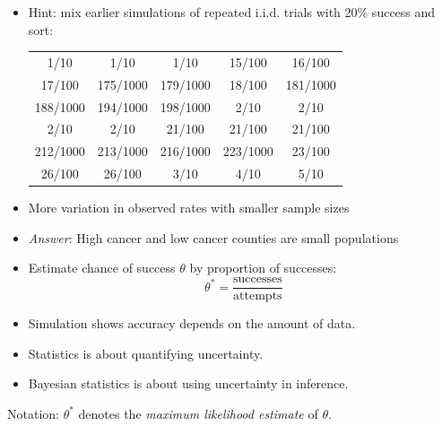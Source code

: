 \documentclass[10pt]{report}
\begin{document}
%
\begin{itemize}
\item Hint: mix earlier simulations of repeated i.i.d. trials with 20\% success and sort:
{\footnotesize
\begin{center}
\begin{tabular}{ccccc}
1/10 &  1/10 &  1/10 &  15/100 &  16/100
\\
17/100 &  175/1000 &  179/1000 &  18/100 &  181/1000
\\
188/1000 &  194/1000 &  198/1000 & 2/10 &  2/10
\\
2/10 &  2/10 & 21/100 &  21/100 &  21/100
\\
212/1000 &  213/1000 &   216/1000 &   223/1000 &  23/100
\\
26/100 &  26/100 &  3/10 &  4/10 &  5/10
\end{tabular}
\end{center}
}
\item More variation in observed rates with smaller sample sizes
\vfill
\item \emph{Answer}: High cancer and low cancer counties are small populations
\end{itemize}



%
\begin{itemize}
\item Estimate chance of success $\theta$ by proportion of successes:
\[
\theta^{*} = \frac{\text{successes}}{\text{attempts}}
\]
\item Simulation shows accuracy depends on the amount of data.
\item Statistics is about quantifying uncertainty.
\item Bayesian statistics is about using uncertainty in inference.
\end{itemize}

{\footnotesize Notation: $\theta^{*}$ denotes the
{\it maximum likelihood estimate} of $\theta$.}
\end{document}

